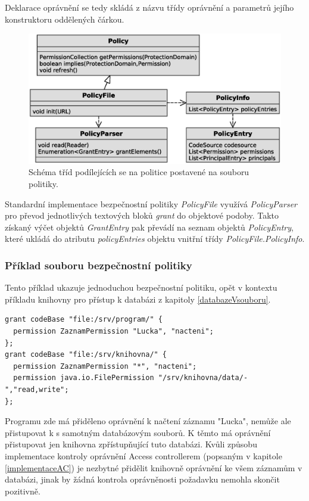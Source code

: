 Deklarace oprávnění se tedy skládá z názvu třídy oprávnění a parametrů jejího konstruktoru oddělených čárkou.

\begin{figure}[ht]
  \centering
  \includegraphics[width=14cm]{fig/policy-schema}
  \caption{Schéma tříd podílejících se na politice postavené na souboru politiky.}
\end{figure}

Standardní implementace bezpečnostní politiky {\it PolicyFile} využívá {\it PolicyParser} pro převod jednotlivých textových bloků {\it grant} do objektové podoby.
Takto získaný výčet objektů {\it GrantEntry} pak převádí na seznam objektů {\it PolicyEntry}, které ukládá do atributu {\it policyEntries} objektu vnitřní třídy {\it PolicyFile.PolicyInfo}.

\subsubsection{Příklad souboru bezpečnostní politiky}

Tento příklad ukazuje jednoduchou bezpečnostní politiku, opět v kontextu příkladu knihovny pro přístup k databázi z kapitoly \ref{databazeVsouboru}.

\begin{verbatim}
grant codeBase "file:/srv/program/" {
  permission ZaznamPermission "Lucka", "nacteni";
};
grant codeBase "file:/srv/knihovna/" {
  permission ZaznamPermission "*", "nacteni";
  permission java.io.FilePermission "/srv/knihovna/data/-","read,write";
};
\end{verbatim}

Programu zde má přiděleno oprávnění k načtení záznamu "Lucka", nemůže ale přistupovat k s samotným databázovým souborů. K těmto má oprávnění přistupovat jen knihovna zpřístupňující tuto databázi. Kvůli způsobu implementace kontroly oprávnění Access controllerem (popsaným v kapitole \ref{implementaceAC}) je nezbytné přidělit knihovně oprávnění ke všem záznamům v databázi, jinak by žádná kontrola oprávněnosti požadavku nemohla skončit pozitivně.

